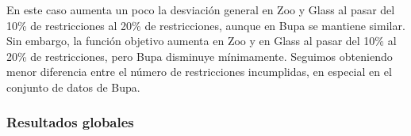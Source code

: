 En este caso aumenta un poco la desviación general en Zoo y Glass al pasar del 10\% de restricciones al 20\% de restricciones, aunque en Bupa se mantiene similar. Sin embargo, 
la función objetivo aumenta en Zoo y en Glass al pasar del 10\% al 20\% de restricciones, pero Bupa disminuye mínimamente.
Seguimos obteniendo menor diferencia entre el número de restricciones incumplidas, en especial en el conjunto de datos de Bupa.

\subsubsection{Resultados globales}


\begin{table}[H]
	\tiny

	\begin{adjustwidth}{-1cm}{-1cm}%
	

\end{adjustwidth}
\end{table}
